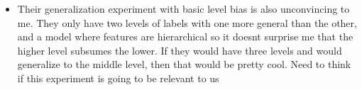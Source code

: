 \documentclass{report}
\begin{document}
\begin{itemize}
   \item Their generalization experiment with basic level bias is also unconvincing to me. They only have two levels of labels with one more general than the other, and a model where features are hierarchical so it doesnt surprise me that the higher level subsumes the lower. If they would have three levels and would generalize to the middle level, then that would be pretty cool. Need to think if this experiment is going to be relevant to us

\end{itemize}






\end{document}
